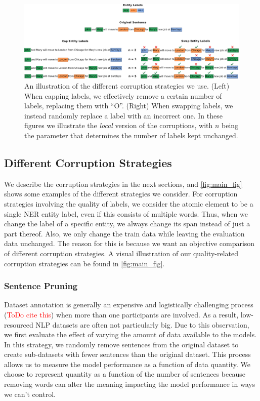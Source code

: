 \documentclass{article}
\newcommand{\mike}[1]{\textcolor{red}{#1}}
\begin{document}
\begin{figure}
    \centering
    \includegraphics[width=1\linewidth]{images/diagram.pdf}
    \caption{An illustration of the different corruption strategies we use. (Left) When capping labels, we effectively remove a certain number of labels, replacing them with ``O''. (Right) When swapping labels, we instead randomly replace a label with an incorrect one. In these figures we illustrate the \textit{local} version of the corruptions, with $n$ being the parameter that determines the number of labels kept unchanged.}
    \label{fig:main_fig}
\end{figure}


\subsection{Different Corruption Strategies}
\label{sec:corrupt_strats}
We describe the corruption strategies in the next sections, and \autoref{fig:main_fig} shows some examples of the different strategies we consider. For corruption strategies involving the quality of labels, we consider the atomic element to be a single NER entity label, even if this consists of multiple words. Thus, when we change the label of a specific entity, we always change its span instead of just a part thereof. Also, we only change the train data while leaving the evaluation data unchanged. The reason for this is because we want an objective comparison of different corruption strategies. A visual illustration of our quality-related corruption strategies can be found in \autoref{fig:main_fig}.
\subsubsection{Sentence Pruning}
\label{sec:method:pruning}

Dataset annotation is generally an expensive and logistically challenging process (\mike{ToDo cite this}) when more than one participants are involved. As a result, low-resourced NLP datasets are often not particularly big. Due to this observation, we first evaluate the effect of varying the amount of data available to the models. In this strategy, we randomly remove sentences from the original dataset to create sub-datasets with fewer sentences than the original dataset. This process allows us to measure the model performance as a function of data quantity. We choose to represent quantity as a function of the number of sentences because removing words can alter the meaning impacting the model performance in ways we can't control.
\end{document}
